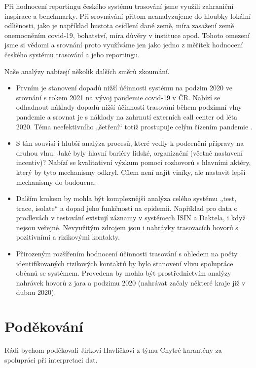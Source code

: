 Při hodnocení reportingu českého systému trasování jsme využili zahraniční inspirace a benchmarky. Při srovnávání přitom neanalyzujeme do hloubky lokální odlišnosti, jako je například hustota osídlení dané země, míra zasažení země onemocněním covid-19, bohatství, míra důvěry v instituce apod. Tohoto omezení jsme si vědomi a srovnání proto využíváme jen jako jedno z měřítek hodnocení českého systému trasování a jeho reportingu.

Naše analýzy nabízejí několik dalších směrů zkoumání.

\begin{itemize}
\item Prvním je stanovení dopadů nižší účinnosti systému na podzim 2020 ve srovnání s rokem 2021 na vývoj pandemie covid-19 v ČR. Nabízí se odhadnout náklady dopadů nižší účinnosti trasování během podzimní vlny pandemie a srovnat je s náklady na zahrnutí externích call center od léta 2020. Téma neefektivního „šetření“ totiž prostupuje celým řízením pandemie \cite{tr_ProkopN, tr_Zidek}.
\item S tím souvisí i hlubší analýza procesů, které vedly k podcenění přípravy na druhou vlnu. Jaké byly hlavní bariéry lidské, organizační (včetně nastavení incentiv)? Nabízí se kvalitativní výzkum pomocí rozhovorů s hlavními aktéry, který by tyto mechanismy odkryl. Cílem není najít viníky, ale nastavit lepší mechanismy do budoucna.
\item Dalším krokem by mohla být komplexnější analýza celého systému „test, trace, isolate“ a dopad jeho funkčnosti na epidemii. Například pro data o prodlevách v testování existují záznamy v systémech ISIN a Daktela, i když nejsou veřejné. Nevyužitým zdrojem jsou i nahrávky trasovacích hovorů s pozitivními a rizikovými kontakty.
\item Přirozeným rozšířením hodnocení účinnosti trasování s ohledem na počty identifikovaných rizikových kontaktů by bylo stanovení vlivu spolupráce občanů se systémem. Provedena by mohla být prostřednictvím analýzy nahrávek hovorů z jara a podzimu 2020 (nahrávat začaly některé kraje již v dubnu 2020).
\end{itemize}

\section*{Poděkování}

Rádi bychom poděkovali Jirkovi Havlíčkovi z týmu Chytré karantény za spolupráci při interpretaci dat.
